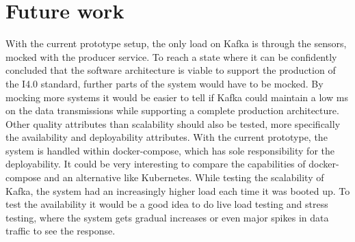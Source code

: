 \section{Future work}

With the current prototype setup, the only load on Kafka is through the sensors, mocked with the producer service. To reach a state where it can be confidently concluded that the software architecture is viable to support the production of the I4.0 standard, further parts of the system would have to be mocked. By mocking more systems it would be easier to tell if Kafka could maintain a low ms on the data transmissions while supporting a complete production architecture.
Other quality attributes than scalability should also be tested, more specifically the availability and deployability attributes.
With the current prototype, the system is handled within docker-compose, which has sole responsibility for the deployability. It could be very interesting to compare the capabilities of docker-compose and an alternative like Kubernetes.
While testing the scalability of Kafka, the system had an increasingly higher load each time it was booted up. To test the availability it would be a good idea to do live load testing and stress testing, where the system gets gradual increases or even major spikes in data traffic to see the response. 